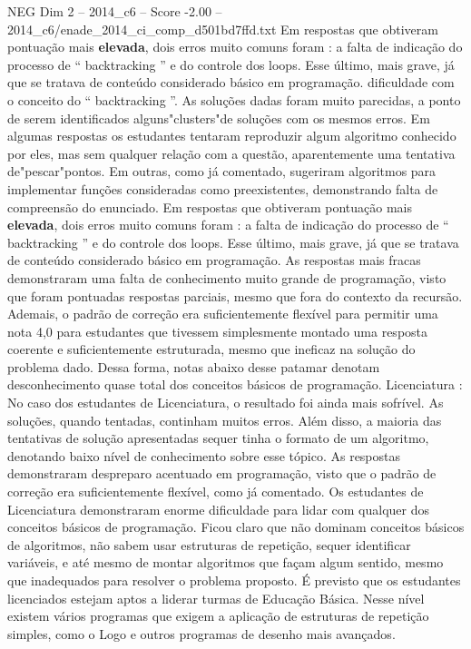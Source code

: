 \begin{textsample}{NEG Dim 2 – 2014\_c6 – Score -2.00 – 2014\_c6/enade\_2014\_ci\_comp\_d501bd7ffd.txt}
Em respostas que obtiveram pontuação mais \textbf{elevada}, dois erros muito comuns foram : a falta de indicação do processo de “ backtracking ” e do controle dos loops.
Esse último, mais grave, já que se tratava de conteúdo considerado básico em programação. dificuldade com o conceito do “ backtracking ”.
As soluções dadas foram muito parecidas, a ponto de serem identificados alguns"clusters"de soluções com os mesmos erros.
Em algumas respostas os estudantes tentaram reproduzir algum algoritmo conhecido por eles, mas sem qualquer relação com a questão, aparentemente uma tentativa de"pescar"pontos.
Em outras, como já comentado, sugeriram algoritmos para implementar funções consideradas como preexistentes, demonstrando falta de compreensão do enunciado.
Em respostas que obtiveram pontuação mais \textbf{elevada}, dois erros muito comuns foram : a falta de indicação do processo de “ backtracking ” e do controle dos loops.
Esse último, mais grave, já que se tratava de conteúdo considerado básico em programação.
As respostas mais fracas demonstraram uma falta de conhecimento muito grande de programação, visto que foram pontuadas respostas parciais, mesmo que fora do contexto da recursão.
Ademais, o padrão de correção era suficientemente flexível para permitir uma nota 4,0 para estudantes que tivessem simplesmente montado uma resposta coerente e suficientemente estruturada, mesmo que ineficaz na solução do problema dado.
Dessa forma, notas abaixo desse patamar denotam desconhecimento quase total dos conceitos básicos de programação.
Licenciatura : No caso dos estudantes de Licenciatura, o resultado foi ainda mais sofrível.
As soluções, quando tentadas, continham muitos erros.
Além disso, a maioria das tentativas de solução apresentadas sequer tinha o formato de um algoritmo, denotando baixo nível de conhecimento sobre esse tópico.
As respostas demonstraram despreparo acentuado em programação, visto que o padrão de correção era suficientemente flexível, como já comentado.
Os estudantes de Licenciatura demonstraram enorme dificuldade para lidar com qualquer dos conceitos básicos de programação.
Ficou claro que não dominam conceitos básicos de algoritmos, não sabem usar estruturas de repetição, sequer identificar variáveis, e até mesmo de montar algoritmos que façam algum sentido, mesmo que inadequados para resolver o problema proposto.
É previsto que os estudantes licenciados estejam aptos a liderar turmas de Educação Básica.
Nesse nível existem vários programas que exigem a aplicação de estruturas de repetição simples, como o Logo e outros programas de desenho mais avançados.

\end{textsample}
